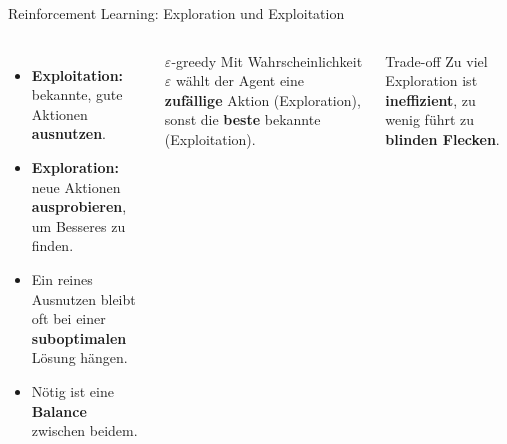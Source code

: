 \begin{frame}{Reinforcement Learning: Exploration und Exploitation}
\begin{columns}
\begin{itemize}
  \item \textbf{Exploitation:} bekannte, gute Aktionen \textbf{ausnutzen}.
  \item \textbf{Exploration:} neue Aktionen \textbf{ausprobieren}, um Besseres
        zu finden.
  \item Ein reines Ausnutzen bleibt oft bei einer \textbf{suboptimalen}
        Lösung hängen.
  \item Nötig ist eine \textbf{Balance} zwischen beidem.
\end{itemize}

\begin{blockC1}{$\varepsilon$-greedy}
Mit Wahrscheinlichkeit $\varepsilon$ wählt der Agent eine
\textbf{zufällige} Aktion (Exploration), sonst die \textbf{beste} bekannte
(Exploitation).
\end{blockC1}

\vspace{0.3em}
\begin{blockC2}{Trade-off}
Zu viel Exploration ist \textbf{ineffizient}, zu wenig führt zu
\textbf{blinden Flecken}.
\end{blockC2}
\end{columns}
\end{frame}


